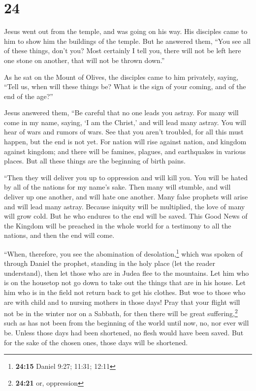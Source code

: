 \hypertarget{section-23}{%
\section{24}\label{section-23}}

 Jesus went out from the temple, and was going on his way.
His disciples came to him to show him the buildings of the temple.
 But he answered them, ``You see all of these things,
don't you? Most certainly I tell you, there will not be left here one
stone on another, that will not be thrown down.''

 As he sat on the Mount of Olives, the disciples came to
him privately, saying, ``Tell us, when will these things be? What is the
sign of your coming, and of the end of the age?''

 Jesus answered them, ``Be careful that no one leads you
astray.  For many will come in my name, saying, `I am the
Christ,' and will lead many astray.  You will hear of wars
and rumors of wars. See that you aren't troubled, for all this must
happen, but the end is not yet.  For nation will rise
against nation, and kingdom against kingdom; and there will be famines,
plagues, and earthquakes in various places.  But all these
things are the beginning of birth pains.

 ``Then they will deliver you up to oppression and will
kill you. You will be hated by all of the nations for my name's sake.
 Then many will stumble, and will deliver up one another,
and will hate one another.  Many false prophets will
arise and will lead many astray.  Because iniquity will
be multiplied, the love of many will grow cold.  But he
who endures to the end will be saved.  This Good News of
the Kingdom will be preached in the whole world for a testimony to all
the nations, and then the end will come.

 ``When, therefore, you see the abomination of
desolation,\footnote{\textbf{24:15} Daniel 9:27; 11:31; 12:11} which was
spoken of through Daniel the prophet, standing in the holy place (let
the reader understand),  then let those who are in Judea
flee to the mountains.  Let him who is on the housetop
not go down to take out the things that are in his house.
 Let him who is in the field not return back to get his
clothes.  But woe to those who are with child and to
nursing mothers in those days!  Pray that your flight
will not be in the winter nor on a Sabbath,  for then
there will be great suffering,\footnote{\textbf{24:21} or, oppression}
such as has not been from the beginning of the world until now, no, nor
ever will be.  Unless those days had been shortened, no
flesh would have been saved. But for the sake of the chosen ones, those
days will be shortened.

